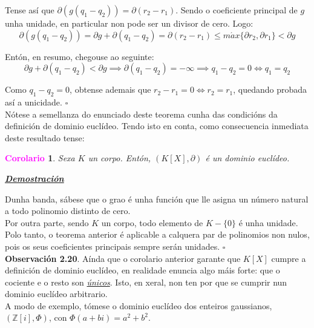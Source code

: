 \documentclass[twoside]{report}
\newcommand{\magbf}[1]{\textcolor{magenta}{\textbf{#1}}} %
\theoremstyle{mystyle}
\newtheorem{cor}{\magbf{Corolario}}[chapter]
\newenvironment{corollary}
{\begin{mdframed}[linecolor = magenta,backgroundcolor = classicrose, linewidth = 2mm]\begin{cor}}
{\end{cor}\end{mdframed}}
\begin{document}
\noindent Tense así que $\partial (g(q_{1} - q_{2})) = \partial (r_{2} - r_{1})$. Sendo o coeficiente principal de $g$ unha unidade, en particular non pode ser un divisor de cero. Logo:
$$\partial (g(q_{1} - q_{2})) = \partial g + \partial (q_{1} - q_{2}) = \partial (r_{2} - r_{1}) \leq m\acute{a}x \{\partial r_{2}, \partial r_{1}\} < \partial g$$

\noindent Entón, en resumo, chegouse ao seguinte:
$$\partial g + \partial (q_{1} - q_{2}) < \partial g \implies \partial (q_{1} - q_{2}) = -\infty \implies q_{1} - q_{2} = 0 \Longleftrightarrow q_{1} = q_{2}$$

\noindent Como $q_{1} - q_{2} = 0$, obtense ademais que $r_{2} - r_{1} = 0 \Longleftrightarrow r_{2} = r_{1}$, quedando probada así a unicidade. $\square$ \\

\noindent Nótese a semellanza do enunciado deste teorema cunha das condicións da definición de dominio euclídeo. Tendo isto en conta, como consecuencia inmediata deste resultado tense:\\

\begin{corollary} \label{cor2.5}
Sexa $K$ un corpo. Entón, $(K[X], \partial)$ é un dominio euclídeo.
\end{corollary}

\vspace{2mm}

\noindent \textbf{\textit{\underline{Demostración}}}

\vspace{2mm}

\noindent Dunha banda, sábese que o grao é unha función que lle asigna un número natural a todo polinomio distinto de cero.\\

\noindent Por outra parte, sendo $K$ un corpo, todo elemento de $K-\{0\}$ é unha unidade. Polo tanto, o teorema anterior é aplicable a calquera par de polinomios non nulos, pois os seus coeficientes principais sempre serán unidades. $\square$\\

\noindent \textbf{Observación 2.20}. Aínda que o corolario anterior garante que $K[X]$ cumpre a definición de dominio euclídeo, en realidade enuncia algo máis forte: que o cociente e o resto son \textit{\underline{únicos}}. Isto, en xeral, non ten por que se cumprir nun dominio euclídeo arbitrario. \\

\noindent A modo de exemplo, tómese o dominio euclídeo dos enteiros gaussianos, $(\mathbb{Z}[i], \Phi)$, con $\Phi(a + bi) = a^{2} + b^{2}$.\\
\end{document}
